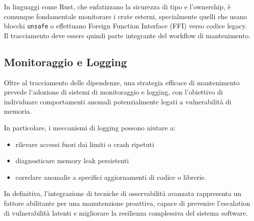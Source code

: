 In linguaggi come Rust, che enfatizzano la sicurezza di tipo e l'ownership, è
comunque fondamentale monitorare i crate esterni, specialmente quelli che usano blocchi
\texttt{unsafe} o effettuano Foreign Function Interface (FFI) verso codice legacy. Il tracciamento deve essere
quindi parte integrante del workflow di mantenimento.

\subsection{Monitoraggio e Logging}
\label{sec:monitoraggio-logging}

Oltre al tracciamento delle dipendenze, una strategia efficace di mantenimento prevede
l'adozione di sistemi di monitoraggio e logging, con l'obiettivo di individuare
comportamenti anomali potenzialmente legati a vulnerabilità di memoria.

In particolare, i meccanismi di logging possono aiutare a:
\begin{itemize}
  \item rilevare accessi fuori dai limiti o crash ripetuti

  \item diagnosticare memory leak persistenti

  \item correlare anomalie a specifici aggiornamenti di codice o librerie.
\end{itemize}

In definitiva, l'integrazione di tecniche di osservabilità avanzata rappresenta un
fattore abilitante per una manutenzione proattiva, capace di prevenire l'escalation
di vulnerabilità latenti e migliorare la resilienza complessiva del sistema
software.